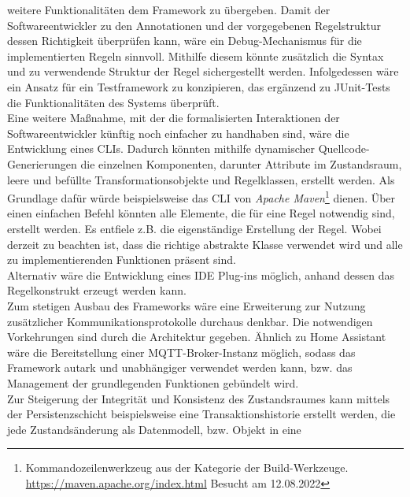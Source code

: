     weitere Funktionalitäten dem Framework zu übergeben. 
    Damit der Softwareentwickler zu den Annotationen und der vorgegebenen Regelstruktur dessen Richtigkeit überprüfen kann, wäre ein Debug-Mechanismus für die implementierten Regeln sinnvoll. 
    Mithilfe diesem könnte zusätzlich die Syntax und zu verwendende Struktur der Regel sichergestellt werden. Infolgedessen wäre ein Ansatz für ein Testframework zu konzipieren, das 
    ergänzend zu JUnit-Tests die Funktionalitäten des Systems überprüft. 
    \\
    \linebreak
    Eine weitere Maßnahme, mit der die formalisierten Interaktionen der Softwareentwickler künftig noch einfacher zu handhaben sind, wäre die Entwicklung eines \ac{CLI}s. Dadurch könnten mithilfe 
    dynamischer Quellcode-Generierungen die einzelnen Komponenten, darunter Attribute im Zustandsraum, leere und befüllte Transformationsobjekte und Regelklassen, erstellt werden. Als Grundlage dafür 
    würde beispielsweise das \acs{CLI} von \textit{Apache Maven}\footnote{Kommandozeilenwerkzeug aus der Kategorie der Build-Werkzeuge. \url{https://maven.apache.org/index.html} Besucht am 12.08.2022} 
    dienen. Über einen einfachen Befehl könnten alle Elemente, die für eine Regel notwendig sind, erstellt werden. Es entfiele z.B. die 
    eigenständige Erstellung der Regel. Wobei derzeit zu beachten ist, dass die richtige abstrakte Klasse verwendet wird und alle zu implementierenden Funktionen präsent sind. 
    \\
    Alternativ wäre die Entwicklung eines \ac{IDE} Plug-ins möglich, anhand dessen das Regelkonstrukt erzeugt werden kann. 
    \\
    \linebreak
    Zum stetigen Ausbau des Frameworks wäre eine Erweiterung zur Nutzung zusätzlicher Kommunikationsprotokolle durchaus denkbar. Die notwendigen Vorkehrungen sind durch die Architektur gegeben. 
    Ähnlich zu Home Assistant wäre die Bereitstellung einer \acs{MQTT}-Broker-Instanz möglich, sodass das Framework autark und unabhängiger verwendet werden kann, bzw. das Management der grundlegenden Funktionen 
    gebündelt wird. 
    \\
    \linebreak
    Zur Steigerung der Integrität und Konsistenz des Zustandsraumes kann mittels der Persistenzschicht beispielsweise eine Transaktionshistorie erstellt werden, die jede Zustandsänderung als Datenmodell, bzw. Objekt in eine 
